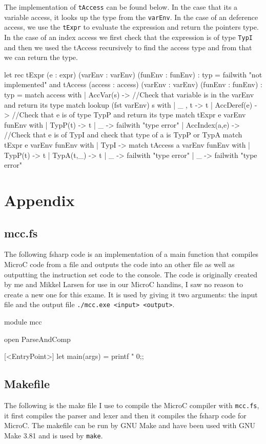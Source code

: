 The implementation of \texttt{tAccess} can be found below. In the case that its
a variable access, it looks up the type from the \texttt{varEnv}. In the case of
an deference access, we use the \texttt{tExpr} to evaluate the expression and
return the pointers type. In the case of an index access we first check that the
expression is of type \texttt{TypI} and then we used the tAccess recursively to
find the access type and from that we can return the type.
\begin{fs}
let rec tExpr (e : expr) (varEnv : varEnv) (funEnv : funEnv) : typ =
    failwith "not implemented"
and tAccess (access : access) (varEnv : varEnv) (funEnv : funEnv) : typ =
    match access with
    | AccVar(s) -> 
      //Check that variable is in the varEnv and return its type
      match lookup (fst varEnv) s with
      | _ , t -> t
    | AccDeref(e) -> 
      //Check that e is of type TypP and return its type
      match tExpr e varEnv funEnv with
      | TypP(t) -> t
      | _ -> failwith "type error"
    | AccIndex(a,e) -> 
      //Check that e is of TypI and check that type of a is TypP or TypA
      match tExpr e varEnv funEnv with
      | TypI -> 
        match tAccess a varEnv funEnv with
        | TypP(t) -> t
        | TypA(t,_) -> t
        | _ -> failwith "type error"
      | _ -> failwith "type error"
\end{fs}

\pagebreak
\section{Appendix}
\subsection{mcc.fs}
The following fsharp code is an implementation of a main function that compiles
MicroC code from a file and outputs the code into an other file as well as
outputting the instruction set code to the console. The code is originally
created by me and Mikkel Larsen for use in our MicroC handins, I saw no reason
to create a new one for this exame. It is used by giving it two arguments: the
input file and the output file \texttt{./mcc.exe <input> <output>}. 
\begin{fs}
module mcc

open ParseAndComp

[<EntryPoint>]
let main(args) =
    printf "%
    0;;
\end{fs}
\subsection{Makefile}
The following is the make file I use to compile the MicroC compiler with
\texttt{mcc.fs}, it first compiles the parser and lexer and then it compiles the
fsharp code for MicroC.  The makefile can be run by GNU Make and have been used
with GNU Make 3.81 and is used by \texttt{make}.

